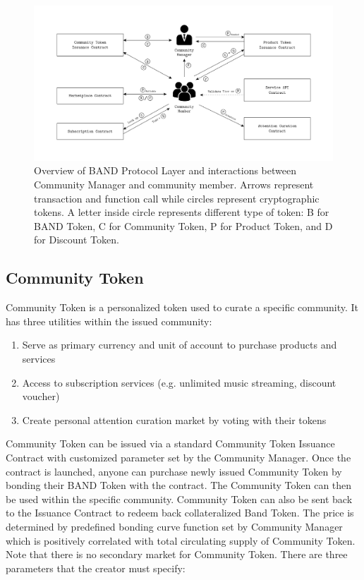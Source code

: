\documentclass[letterpaper,11pt]{article}
\begin{document}
\bigbreak
\begin{figure}[h]
    \centering
    \includegraphics[width=1\textwidth]{figures/protocol}
    \caption{Overview of BAND Protocol Layer and interactions between Community Manager and community member. Arrows represent transaction and function call while circles represent cryptographic tokens. A letter inside circle represents different type of token: B for BAND Token, C for Community Token, P for Product Token, and D for Discount Token.}
    \label{fig:bandlayer}
\end{figure}

\newpage
\subsection{Community Token} \label{sec:community-token}
Community Token is a personalized token used to curate a specific community. It has three utilities within the issued community:

\begin{enumerate}
\setlength\itemsep{0em}
\item Serve as primary currency and unit of account to purchase products and services
\item Access to subscription services (e.g. unlimited music streaming, discount voucher)
\item Create personal attention curation market by voting with their tokens
\end{enumerate}
Community Token can be issued via a standard Community Token Issuance Contract with customized parameter set by the Community Manager. Once the contract is launched, anyone can purchase newly issued Community Token by bonding their BAND Token with the contract. The Community Token can then be used within the specific community. Community Token can also be sent back to the Issuance Contract to redeem back collateralized Band Token. The price is determined by predefined bonding curve function set by Community Manager which is positively correlated with total circulating supply of Community Token. Note that there is no secondary market for Community Token. There are three parameters that the creator must specify:
\end{document}
